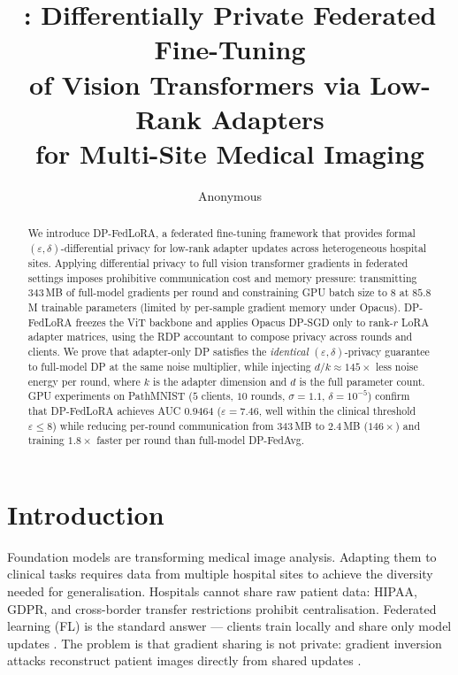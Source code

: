 ﻿\documentclass{article}
\title{\method{}: Differentially Private Federated Fine-Tuning\\
of Vision Transformers via Low-Rank Adapters\\
for Multi-Site Medical Imaging}
\author{Anonymous}
\newcommand{\method}{DP-FedLoRA}
\renewcommand{\eps}{\varepsilon}
\newcommand{\noise}{\sigma}
\begin{document}
\maketitle

\begin{abstract}
%
We introduce \method{}, a federated fine-tuning framework that provides
formal $(\eps, \delta)$-differential privacy for low-rank adapter updates
across heterogeneous hospital sites.
Applying differential privacy to full vision transformer gradients in
federated settings imposes prohibitive communication cost and memory
pressure: transmitting $343$\,MB of full-model gradients per round and
constraining GPU batch size to $8$ at $85.8$M trainable parameters (limited
by per-sample gradient memory under Opacus).
\method{} freezes the ViT backbone and applies Opacus DP-SGD only to
rank-$r$ LoRA adapter matrices, using the RDP accountant to compose
privacy across rounds and clients.
We prove that adapter-only DP satisfies the \emph{identical}
$(\eps, \delta)$-privacy guarantee to full-model DP at the same noise
multiplier, while injecting $d/k \approx 145{\times}$ less noise energy
per round, where $k$ is the adapter dimension and $d$ is the full parameter
count.
GPU experiments on PathMNIST ($5$ clients, $10$ rounds, $\noise{=}1.1$,
$\delta{=}10^{-5}$) confirm that \method{} achieves AUC $0.9464$
($\eps{=}7.46$, well within the clinical threshold $\eps \leq 8$) while
reducing per-round communication from $343$\,MB to $2.4$\,MB ($146{\times}$)
and training $1.8{\times}$ faster per round than full-model DP-FedAvg.
\end{abstract}

\section{Introduction}
\label{sec:intro}

Foundation models are transforming medical image analysis.
Adapting them to clinical tasks requires data from multiple hospital sites
to achieve the diversity needed for generalisation.
Hospitals cannot share raw patient data: HIPAA, GDPR, and cross-border
transfer restrictions prohibit centralisation.
Federated learning (FL) is the standard answer --- clients train locally
and share only model updates \citep{mcmahan2017communication}.
The problem is that gradient sharing is not private: gradient inversion
attacks reconstruct patient images directly from shared
updates \citep{zheng2025sensitivity}.
\end{document}
